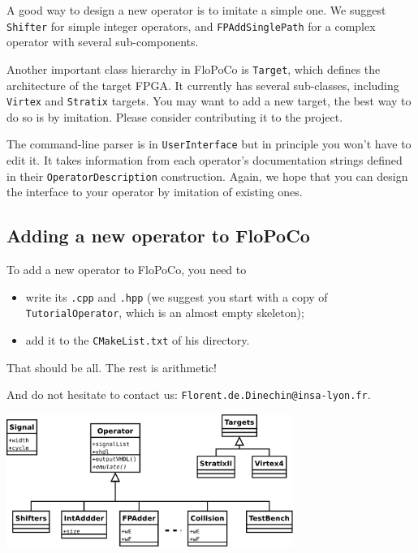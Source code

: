 \documentclass{article}
\begin{document}
A good way to design a new operator is to imitate a simple one. We suggest
\texttt{Shifter} for simple integer operators, and \texttt{FPAddSinglePath}
for a complex operator with several sub-components.


Another important class hierarchy in FloPoCo is \texttt{Target}, which
defines the architecture of the target FPGA. It currently has several sub-classes,
including \texttt{Virtex} and \texttt{Stratix} targets. You may want to
add a new target, the best way to do so is by imitation. Please
consider contributing it to the project.

The command-line parser is in \texttt{UserInterface} but in principle you won't have to edit it.
It takes information from each operator's documentation strings defined in their \texttt{OperatorDescription} construction. 
Again, we hope that you can design the interface to your operator by imitation of existing ones.

\subsection{Adding a new operator to FloPoCo}
To add a new operator to FloPoCo, you need to 
\begin{itemize}
\item write its \texttt{.cpp} and \texttt{.hpp} (we suggest you start with a copy of  \texttt{TutorialOperator}, which is an almost empty skeleton);
\item add it to the \texttt{CMakeList.txt} of his directory.
\end{itemize}

That should be all. The rest is arithmetic!

And do not hesitate to contact us: \texttt{Florent.de.Dinechin@insa-lyon.fr}.

\begin{center}
  \includegraphics[width=0.7\textwidth]{../Figures/FloPoCoClasses.pdf}        
\end{center}
\end{document}
